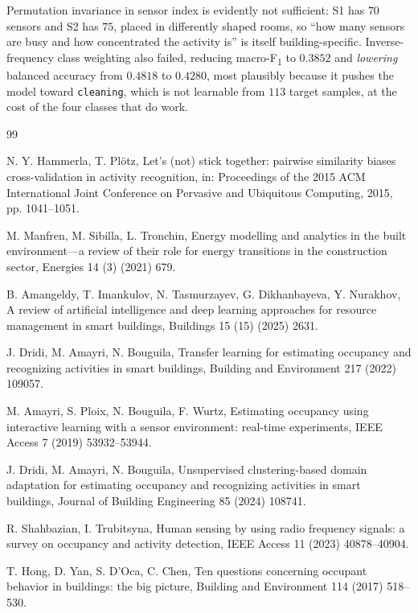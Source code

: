\documentclass[a4paper,fleqn]{cas-dc}
\newcommand{\macf}{macro-F\textsubscript{1}}
\begin{document}
Permutation invariance in sensor index is evidently not sufficient: S1 has $70$ sensors and
S2 has $75$, placed in differently shaped rooms, so ``how many sensors are busy and how
concentrated the activity is'' is itself building-specific. Inverse-frequency class
weighting also failed, reducing \macf{} to $0.3852$ and \emph{lowering} balanced accuracy
from $0.4818$ to $0.4280$, most plausibly because it pushes the model toward
\texttt{cleaning}, which is not learnable from $113$ target samples, at the cost of the
four classes that do work.

\begin{thebibliography}{99}

 N. Y. Hammerla, T. Pl\"otz, Let's (not) stick together: pairwise
similarity biases cross-validation in activity recognition, in: Proceedings of the 2015
ACM International Joint Conference on Pervasive and Ubiquitous Computing, 2015,
pp. 1041--1051.

 M. Manfren, M. Sibilla, L. Tronchin, Energy modelling and analytics
in the built environment---a review of their role for energy transitions in the
construction sector, Energies 14 (3) (2021) 679.

 B. Amangeldy, T. Imankulov, N. Tasmurzayev, G. Dikhanbayeva,
Y. Nurakhov, A review of artificial intelligence and deep learning approaches for resource
management in smart buildings, Buildings 15 (15) (2025) 2631.

 J. Dridi, M. Amayri, N. Bouguila, Transfer learning for estimating
occupancy and recognizing activities in smart buildings, Building and Environment 217
(2022) 109057.

 M. Amayri, S. Ploix, N. Bouguila, F. Wurtz, Estimating occupancy using
interactive learning with a sensor environment: real-time experiments, IEEE Access 7 (2019)
53932--53944.

 J. Dridi, M. Amayri, N. Bouguila, Unsupervised clustering-based
domain adaptation for estimating occupancy and recognizing activities in smart buildings,
Journal of Building Engineering 85 (2024) 108741.

 R. Shahbazian, I. Trubitsyna, Human sensing by using radio
frequency signals: a survey on occupancy and activity detection, IEEE Access 11 (2023)
40878--40904.

 T. Hong, D. Yan, S. D'Oca, C. Chen, Ten questions concerning occupant
behavior in buildings: the big picture, Building and Environment 114 (2017) 518--530.


\end{thebibliography}
\end{document}
